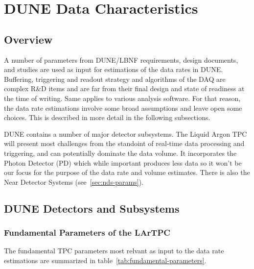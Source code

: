 \section{DUNE Data Characteristics}
\subsection{Overview}

A number of parameters from DUNE/LBNF requirements, design documents,  and studies are used  as input
for estimations of the data rates in DUNE.
Buffering, triggering and readout strategy and algorithms of the DAQ
are complex R\&D items and are far from their final design and state of
readiness at the time of writing. Same applies to various analysis software.
For that reason, the data rate estimations involve some broad assumptions
and leave open some choices. This is described in more detail in the following subsections.

DUNE contains a number of major detector subsystems. The Liquid Argon TPC will present most challenges from
the standoint of real-time data processing and triggering, and can potentially dominate the data volume.
It incorporates the Photon Detector (PD) which while important produces less data so it won't be our focus
for the purpose of the data rate and volume estimates. There is also the Near
Detector Systems (see~\ref{sec:nds-params}).

\subsection{DUNE Detectors and Subsystems}

\subsubsection{Fundamental Parameters of the LArTPC}

The fundamental TPC parameters most relvant as input to the data rate estimations are summarized in
table~\ref{tab:fundamental-parameters}.

